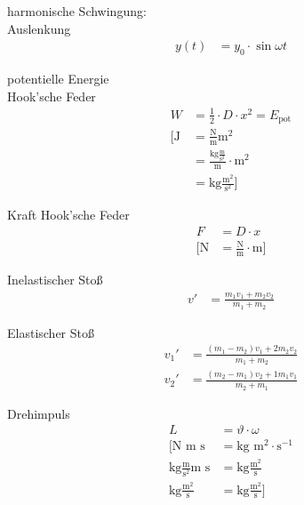 \begin{karte}{harmonische Schwingung:\\Auslenkung}
    \begin{align*}
        y(t) &= y_0 \cdot \sin \omega t
    \end{align*}
\end{karte}

\begin{karte}{potentielle Energie\\Hook'sche Feder}
    \begin{align*}
        W &= \frac{1}{2}\cdot D\cdot x^2 = E_\text{pot} \\
        \bigg[ \text{J} &= \frac{\text{N}}{\text{m}} \text{m}^2 \\
        &= \frac{\text{kg}\frac{\text{m}}{\text{s}^2}}{\text{m}} \cdot \text{m}^2 \\
        &= \text{kg}\frac{\text{m}^2}{\text{s}^2} \bigg]
    \end{align*}
\end{karte}

\begin{karte}{Kraft Hook'sche Feder}
    \begin{align*}
        F &= D \cdot x \\
        \bigg[ \text{N} &= \frac{\text{N}}{\text{m}} \cdot \text{m} \bigg]
    \end{align*}
\end{karte}

\begin{karte}{Inelastischer Stoß}
    \begin{align*}
        v' &= \frac{ m_1v_1+m_2v_2}{m_1+m_2}
    \end{align*}
\end{karte}

\begin{karte}{Elastischer Stoß}
    \begin{align*}
        v_1'&= \frac{(m_1-m_2)v_1 + 2m_2v_2}{m_1+m_2} \\
        v_2'&= \frac{(m_2-m_1)v_2 + 1m_1v_1}{m_2+m_1}
    \end{align*}
\end{karte}

\begin{karte}{Drehimpuls}
    \begin{align*}
        L &= \vartheta \cdot \omega \\
        \bigg[ \text{N m s} &= \text{kg }\text{m}^2 \cdot \text{s}^{-1} \\
            \text{kg} \frac{\text{m}}{\text{s}^2} \text{m s}&= \text{kg} \frac{\text{m}^2}{\text{s}} \\
            \text{kg} \frac{\text{m}^2}{\text{s}} &= \text{kg} \frac{\text{m}^2}{\text{s}}
            \bigg]
    \end{align*}
\end{karte}

